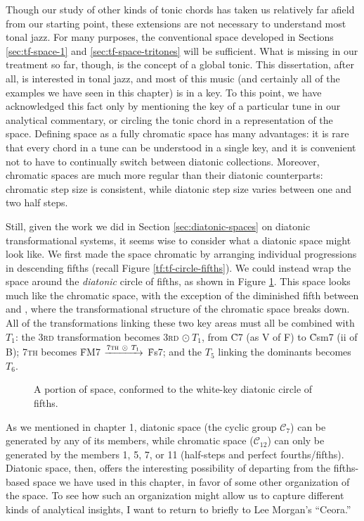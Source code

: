 {Though our study of other kinds of tonic chords has taken us relatively far
afield from our starting point, these extensions are not necessary to
understand most tonal jazz. For many purposes, the conventional space
developed in Sections \ref{sec:tf-space-1} and \ref{sec:tf-space-tritones}
will be sufficient. What is missing in our treatment so far, though, is the
concept of a global tonic. This dissertation, after all, is interested in
tonal jazz, and most of this music (and certainly all of the examples we have
seen in this chapter) is in a key. To this point, we have acknowledged
this fact only by mentioning the key of a particular tune in our analytical
commentary, or circling the tonic chord in a representation of the space.
Defining \tf space as a fully chromatic space has many advantages: it is rare
that every chord in a tune can be understood in a single key, and it is
convenient not to have to continually switch between diatonic collections.
Moreover, chromatic spaces are much more regular than their diatonic
counterparts: chromatic step size is consistent, while diatonic step size
varies between one and two half steps.

Still, given the work we did in Section \ref{sec:diatonic-spaces} on diatonic
transformational systems, it seems wise to consider what a diatonic \tf space
might look like. We first made the space chromatic by arranging individual
\tfo progressions in descending fifths (recall Figure
\ref{tf:tf-circle-fifths}). We could instead wrap the space around the
\emph{diatonic} circle of fifths, as shown in Figure
\ref{tfe:tf-diatonic-fifths}. This space looks much like the chromatic space,
with the exception of the diminished fifth between  and , where the
transformational structure of the chromatic space breaks down.
All of the transformations linking these two key areas must all be combined
with $T_1$: the \textsc{3rd} transformation becomes \textsc{3rd} $\odot\ T_1$,
from \h{C7} (as V of F) to \h{Csm7} (ii of B); \textsc{7th}
becomes \h{FM7} $\xrightarrow{7\text{\textsc{th}}\ \odot\ T_1}$ \h{Fs7}; and the
$T_5$ linking the dominants becomes $T_6$.

\begin{figure}[tbp]
  \caption{A portion of \tf space, conformed to the white-key diatonic circle
    of fifths.}
  \label{tfe:tf-diatonic-fifths}
\end{figure}

As we mentioned in chapter 1, diatonic space (the cyclic group
$\mathcal{C}_7$) can be generated by any of its members, while chromatic space
($\mathcal{C}_{12}$) can only be generated by the members 1, 5, 7, or 11
(half-steps and perfect fourths/fifths). Diatonic \tf space, then, offers the
interesting possibility of departing from the fifths-based space we have used
in this chapter, in favor of some other organization of the space. To see how
such an organization might allow us to capture different kinds of analytical
insights, I want to return to briefly to Lee Morgan's ``Ceora.''

}
